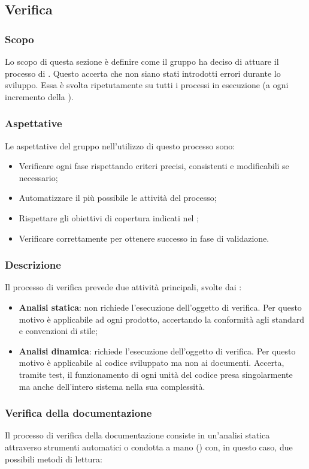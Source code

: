 \subsection{Verifica}
\subsubsection{Scopo}
Lo scopo di questa sezione è definire come il gruppo ha deciso di attuare il processo di . Questo accerta che non siano stati introdotti errori durante lo sviluppo. Essa è svolta ripetutamente su tutti i processi in esecuzione (a ogni incremento della ).

\subsubsection{Aspettative}
Le aspettative del gruppo \Gruppo{} nell'utilizzo di questo processo sono:
\begin{itemize}
	\item Verificare ogni fase rispettando criteri precisi, consistenti e modificabili se necessario;
	\item Automatizzare il più possibile le attività del processo;
	\item Rispettare gli obiettivi di copertura indicati nel \PdQv{};
	\item Verificare correttamente per ottenere successo in fase di validazione.
\end{itemize}

\subsubsection{Descrizione}
Il processo di verifica prevede due attività principali, svolte dai :
\begin{itemize}
	\item \textbf{Analisi statica}: non richiede l'esecuzione dell'oggetto di verifica. Per questo motivo è applicabile ad ogni prodotto, accertando la conformità agli standard e convenzioni di stile;
	\item \textbf{Analisi dinamica}: richiede l'esecuzione dell'oggetto di verifica. Per questo motivo è applicabile al codice sviluppato ma non ai documenti. Accerta, tramite test, il funzionamento di ogni unità del codice presa singolarmente ma anche dell'intero sistema nella sua complessità.
\end{itemize}

\subsubsection{Verifica della documentazione}
Il processo di verifica della documentazione consiste in un'analisi statica attraverso strumenti automatici o condotta a mano () con, in questo caso, due possibili metodi di lettura:   

